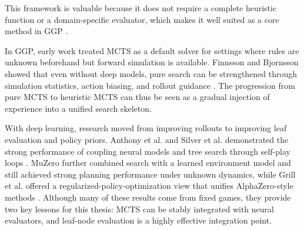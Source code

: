 This framework is valuable because it does not require a complete heuristic function or a domain-specific evaluator, which makes it well suited as a core method in GGP \cite{browne2012survey}.


In GGP, early work treated MCTS as a default solver for settings where rules are unknown beforehand but forward simulation is available. Finnsson and Bjornsson showed that even without deep models, pure search can be strengthened through simulation statistics, action biasing, and rollout guidance \cite{finnsson2008simulation}. The progression from pure MCTS to heuristic MCTS can thus be seen as a gradual injection of experience into a unified search skeleton.


With deep learning, research moved from improving rollouts to improving leaf evaluation and policy priors. Anthony et al. and Silver et al. demonstrated the strong performance of coupling neural models and tree search through self-play loops \cite{anthony2017thinking,silver2018general}. MuZero further combined search with a learned environment model and still achieved strong planning performance under unknown dynamics, while Grill et al. offered a regularized-policy-optimization view that unifies AlphaZero-style methods \cite{schrittwieser2020muzero,grill2020regularized}. Although many of these results come from fixed games, they provide two key lessons for this thesis: MCTS can be stably integrated with neural evaluators, and leaf-node evaluation is a highly effective integration point.

